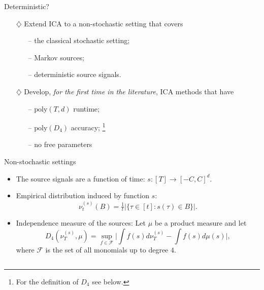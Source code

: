 \documentclass[final]{beamer} %
\begin{document}
\begin{frame}[c]
\begin{columns}[t,totalwidth=\textwidth]
\begin{column}{.24\textwidth}
\begin{block}{Deterministic?}
			\vspace{1cm}
			\begin{tcolorbox}[title = \vspace{0.4cm}\textbf{\large Our Contributions} \vspace{0.4cm}, title filled, width = 0.9\textwidth, colback = uofagreen!10, colframe = red]
			\begin{itemize}
			\vspace{0.5cm}
			\item[$\diamondsuit$] Extend ICA to a non-stochastic setting that covers
			\begin{itemize}
			\item[--] the classical stochastic setting;
			\item[--] Markov sources;
			\item[--] deterministic source signals.
			\end{itemize} 
			\vspace{1cm}
			\item[$\diamondsuit$] Develop, \emph{for the first time in the literature}, ICA methods that have
				\begin{itemize}
					\item[--] $\mathrm{poly}(T,d)$ runtime;
					\item[--] $\mathrm{poly}(D_4)$ accuracy;%
					\footnote{For the definition of $D_4$ see below.}
					\item[--] no free parameters
				\end{itemize}
			\vspace{1cm}
			\end{itemize}	
			\end{tcolorbox}
		\end{block}
		\vspace{0.5ex}
		\begin{block}{Non-stochastic settings}
			\begin{itemize}
				\item The source signals are a function of time: $s:[T] \to [-C,C]^d$.
				\item Empirical distribution induced by function $s$:
				\[
					\nu_t^{(s)}(B)=\tfrac{1}{t}|\{\tau \in [t]: s(\tau) \in B\}|.
				\]
				\item Independence measure of the sources:
				Let $\mu$ be a product measure and let
				\[
				D_4(\nu_T^{(s)},\mu) = \sup_{f\in\mathcal{F}} \Big|\int f(s)d\nu_T^{(s)} - \int f(s)d\mu(s)\Big|,
				\]
				where $\mathcal{F}$ is the set of all monomials up to degree $4$.
			\end{itemize}

\end{block}
\end{column}
\end{columns}
\end{frame}
\end{document}
